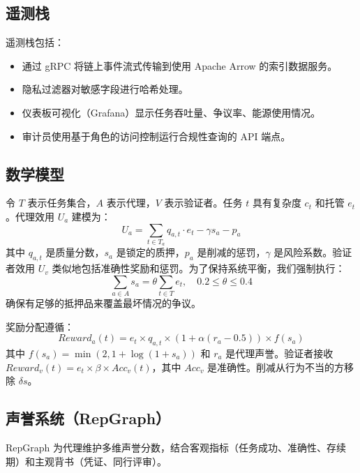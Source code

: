 \documentclass[11pt]{article}
\begin{document}
\subsection{遥测栈}
遥测栈包括：
\begin{itemize}[noitemsep]
  \item 通过 gRPC 将链上事件流式传输到使用 Apache Arrow 的索引数据服务。
  \item 隐私过滤器对敏感字段进行哈希处理。
  \item 仪表板可视化（Grafana）显示任务吞吐量、争议率、能源使用情况。
  \item 审计员使用基于角色的访问控制运行合规性查询的 API 端点。
\end{itemize}

\subsection{数学模型}
令 $T$ 表示任务集合，$A$ 表示代理，$V$ 表示验证者。任务 $t$ 具有复杂度 $c_t$ 和托管 $e_t$。代理效用 $U_a$ 建模为：
\begin{equation}
U_a = \sum_{t \in T_a} q_{a,t}\cdot e_t - \gamma s_a - p_a\label{eq:agent-utility}
\end{equation}
其中 $q_{a,t}$ 是质量分数，$s_a$ 是锁定的质押，$p_a$ 是削减的惩罚，$\gamma$ 是风险系数。验证者效用 $U_v$ 类似地包括准确性奖励和惩罚。为了保持系统平衡，我们强制执行：
\begin{equation}
\sum_{a \in A} s_a = \theta \sum_{t \in T} e_t,\quad 0.2 \leq \theta \leq 0.4
\end{equation}
确保有足够的抵押品来覆盖最坏情况的争议。

奖励分配遵循：
\begin{equation}
Reward_a(t) = e_t \times q_{a,t} \times \left(1 + \alpha (r_a - 0.5)\right) \times f(s_a)
\end{equation}
其中 $f(s_a) = \min(2, 1 + \log(1+s_a))$ 和 $r_a$ 是代理声誉。验证者接收 $Reward_v(t) = e_t \times \beta \times Acc_v(t)$，其中 $Acc_v$ 是准确性。削减从行为不当的方移除 $\delta s$。

\subsection{声誉系统（RepGraph）}
\label{sec:reputation}
RepGraph 为代理维护多维声誉分数，结合客观指标（任务成功、准确性、存续期）和主观背书（凭证、同行评审）。
\end{document}
